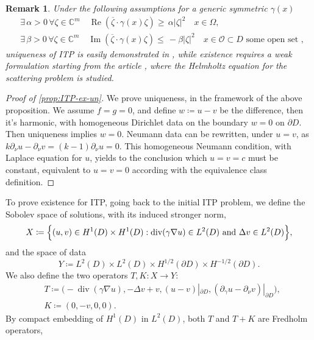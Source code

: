 \documentclass[10pt, a4paper, twoside, openright]{book}
\theoremstyle{definition}
\theoremstyle{plain}
\theoremstyle{plain}
\theoremstyle{plain}
\theoremstyle{plain}
\newtheorem{remark}[subsection]{Remark}
\theoremstyle{plain}
\theoremstyle{plain}
\theoremstyle{plain}
\theoremstyle{plain}
\DeclareMathOperator{\divergence}{div}
\DeclareMathOperator{\real}{Re}
\DeclareMathOperator{\imag}{Im}
\begin{document}
\begin{remark}
Under the following assumptions for a generic symmetric $\gamma(x)$
\begin{align}
 &\exists\, \alpha>0\,\forall \zeta \in \mathbb{C}^m\quad \real(\overline{\zeta}\cdot\gamma(x)\zeta)     \geq\,  \alpha|\zeta|^2 \quad x\in \Omega,\\
 &\exists\, \beta>0\,\forall \zeta \in \mathbb{C}^m\quad \imag(\overline{\zeta}\cdot\gamma(x)\zeta)        \leq\,  -\beta|\zeta|^2 \quad x\in \mathcal{O} \subset D \text{ some open set },
\end{align}
uniqueness  of ITP is easily demonstrated in \cite{somersalo:preprint}, while existence requires a weak formulation starting from the article \cite{cakoni-colton-haddar:lsm}, where the Helmholtz equation for the scattering problem is studied.
\end{remark}
\begin{proof}[Proof of \ref{prop:ITP-ex-un}]
 We prove uniqueness, in the framework of the above proposition. 
 We assume $f=g=0$, and define $w\coloneqq u-v$ be the difference, then it's harmonic, 
 with homogeneous Dirichlet data on the boundary $w=0$ on $\partial D$. Then uniqueness implies $w=0$. Neumann data can be rewritten, under $u=v$, as $k\partial_\nu u - \partial_\nu v = (k-1)\partial_\nu u = 0$.
 This homogeneous Neumann condition, with Laplace equation for $u$, yields to the conclusion which $u=v=c$ must be constant, equivalent to $u=v=0$ according with the equivalence class definition.
\end{proof}
To prove existence for ITP, going back to the initial ITP problem, we define the Sobolev space of solutions, with its induced stronger norm,
\begin{equation}
 X\coloneqq\Bigl\{(u,v)\in H^1(D)\times H^1(D):\divergence(\gamma\nabla u)\in L^2(D) \textup{ and } \Delta v\in L^2(D) \Bigr\},
\end{equation}
and the space of data
\begin{equation}
 Y\coloneqq L^2(D) \times L^2(D) \times H^{1/2}(\partial D) \times H^{-1/2}(\partial D).
\end{equation}
We also define the two operators $T,K:X\to Y$:
\begin{align}
& T \coloneqq \bigl(-\divergence(\gamma\nabla u), -\Delta v + v, (u - v)|_{\partial D}, (\partial_\gamma u -\partial_\nu v)|_{\partial D}\bigr),\\
& K \coloneqq (0, -v, 0 , 0).
\end{align}
By compact embedding of $H^1(D)$ in $L^2(D)$, both $T$ and $T+K$ are Fredholm operators, 
\end{document}
